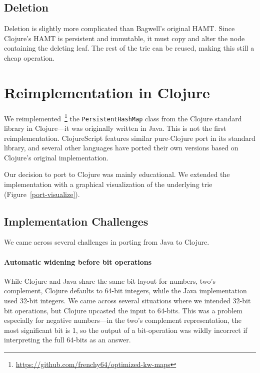\documentclass[preprint]{sigplanconf}
\begin{document}
\subsection{Deletion}
Deletion is slightly more complicated than Bagwell's original
HAMT. Since Clojure's HAMT is persistent and immutable, it
must copy and alter the node containing the deleting leaf.
The rest of the trie can be reused, making this still a cheap
operation.

\section{Reimplementation in Clojure}

We reimplemented~\footnote{\url{https://github.com/frenchy64/optimized-kw-maps}}
the \texttt{PersistentHashMap} class from
the Clojure standard library in Clojure---it was originally
written in Java.
This is not the first reimplementation. ClojureScript
features similar pure-Clojure port in its standard library,
and several other languages have ported their own versions
based on Clojure's original implementation.

Our decision to port to Clojure was mainly educational.
We extended the implementation with a graphical visualization
of the underlying trie
(Figure~\ref{port-visualize}).

\subsection{Implementation Challenges}

We came across several challenges in porting from Java to
Clojure.

\paragraph{Automatic widening before bit operations}
While Clojure and Java share the same bit layout
for numbers, two's complement, Clojure
defaults to 64-bit integers, while the Java
implementation used 32-bit integers.
%
We came across several situations
where we intended 32-bit bit operations, but
Clojure upcasted the input to 64-bits. This
was a problem especially for negative numbers---in
the two's complement representation, the most
significant bit is 1, so the output of a bit-operation
was wildly incorrect if interpreting the full
64-bits as an answer.

%
\end{document}
